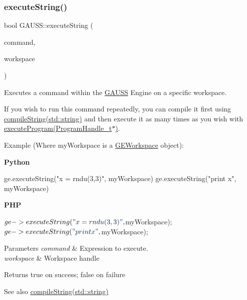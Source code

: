 \subsubsection{\texorpdfstring{execute\+String()}{executeString()}\hspace{0.1cm}{\footnotesize\ttfamily [2/2]}}
{\footnotesize\ttfamily bool G\+A\+U\+S\+S\+::execute\+String (\begin{DoxyParamCaption}\item[{std\+::string}]{command,  }\item[{\hyperlink{class_g_e_workspace}{G\+E\+Workspace} $\ast$}]{workspace }\end{DoxyParamCaption})}



Executes a command within the \hyperlink{class_g_a_u_s_s}{G\+A\+U\+SS} Engine on a specific workspace. 

If you wish to run this command repeatedly, you can compile it first using \hyperlink{class_g_a_u_s_s_a3ecf1522874c8ae5aa8fb8173d515b73}{compile\+String(std\+::string)} and then execute it as many times as you wish with \hyperlink{class_g_a_u_s_s_a7fc9de69421c14aadb9a6310fecabcca}{execute\+Program(\+Program\+Handle\+\_\+t$\ast$)}.

Example (Where {\ttfamily my\+Workspace} is a \hyperlink{class_g_e_workspace}{G\+E\+Workspace} object)\+:

{\bfseries Python} 
\begin{DoxyCode}
ge.executeString(\textcolor{stringliteral}{"x = rndu(3,3)"}, myWorkspace)
ge.executeString(\textcolor{stringliteral}{"print x"}, myWorkspace)
\end{DoxyCode}


{\bfseries P\+HP} 
\begin{DoxyCode}
$ge->executeString(\textcolor{stringliteral}{"x = rndu(3,3)"}, $myWorkspace);
$ge->executeString(\textcolor{stringliteral}{"print x"}, $myWorkspace);
\end{DoxyCode}



\begin{DoxyParams}{Parameters}
{\em command} & Expression to execute. \\
\hline
{\em workspace} & Workspace handle \\
\hline
\end{DoxyParams}
\begin{DoxyReturn}{Returns}
true on success; false on failure
\end{DoxyReturn}
\begin{DoxySeeAlso}{See also}
\hyperlink{class_g_a_u_s_s_a3ecf1522874c8ae5aa8fb8173d515b73}{compile\+String(std\+::string)} 
\end{DoxySeeAlso}
\mbox{\label{class_g_a_u_s_s_a64c8cf4b564aea63ed8e771c969b8936}} 
